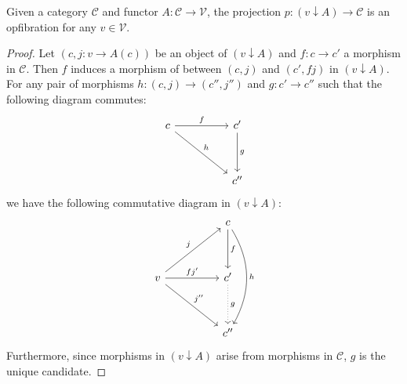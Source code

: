 \begin{thm}
Given a category $\mathcal{C}$ and functor $A : \mathcal{C} \to \mathcal{V}$, the projection $p : (v \downarrow A) \to \mathcal{C}$ is an opfibration for any $v \in \mathcal{V}$.
\begin{proof}
Let $(c, j: v \to A(c))$ be an object of $(v \downarrow A)$ and $f: c \to c'$ a morphism in $\mathcal{C}$. Then $f$ induces a morphism of between $(c, j)$ and $(c', fj)$ in $(v \downarrow A)$. For any pair of morphisms $h : (c, j) \to (c'', j'')$ and $g : c' \to c''$ such that the following diagram commutes:
\[
\ti
c \ar[r, "f"] \ar[rd, "h"] & c' \ar[d, "g"]\\
& c''
\kz
\]
we have the following commutative diagram in $(v \downarrow A)$:
\[
\ti
& c \ar[d, "f"] \ar[dd, "h", bend left]\\
v \ar[ru, "j"] \ar[rd, "j''"] \ar[r, "f j'"]& c' \ar[d, dotted, "g"]\\
& c''
\kz
\]
Furthermore, since morphisms in $(v \downarrow A)$ arise from morphisms in $\mathcal{C}$, $g$ is the unique candidate.
\end{proof}
\end{thm}

